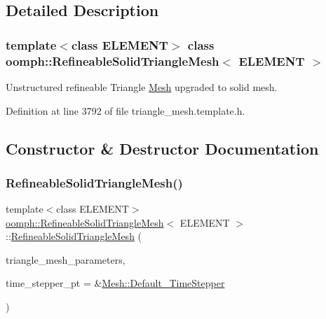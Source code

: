 \subsection{Detailed Description}
\subsubsection*{template$<$class E\+L\+E\+M\+E\+NT$>$\newline
class oomph\+::\+Refineable\+Solid\+Triangle\+Mesh$<$ E\+L\+E\+M\+E\+N\+T $>$}

Unstructured refineable Triangle \hyperlink{classoomph_1_1Mesh}{Mesh} upgraded to solid mesh. 

Definition at line 3792 of file triangle\+\_\+mesh.\+template.\+h.



\subsection{Constructor \& Destructor Documentation}
\mbox{\label{classoomph_1_1RefineableSolidTriangleMesh_a813f756c2576d7ef129a603f4ac441ba}} 
\subsubsection{\texorpdfstring{Refineable\+Solid\+Triangle\+Mesh()}{RefineableSolidTriangleMesh()}\hspace{0.1cm}{\footnotesize\ttfamily [1/2]}}
{\footnotesize\ttfamily template$<$class E\+L\+E\+M\+E\+NT$>$ \\
\hyperlink{classoomph_1_1RefineableSolidTriangleMesh}{oomph\+::\+Refineable\+Solid\+Triangle\+Mesh}$<$ E\+L\+E\+M\+E\+NT $>$\+::\hyperlink{classoomph_1_1RefineableSolidTriangleMesh}{Refineable\+Solid\+Triangle\+Mesh} (\begin{DoxyParamCaption}\item[{\hyperlink{classoomph_1_1TriangleMeshParameters}{Triangle\+Mesh\+Parameters} \&}]{triangle\+\_\+mesh\+\_\+parameters,  }\item[{\hyperlink{classoomph_1_1TimeStepper}{Time\+Stepper} $\ast$}]{time\+\_\+stepper\+\_\+pt = {\ttfamily \&\hyperlink{classoomph_1_1Mesh_a12243d0fee2b1fcee729ee5a4777ea10}{Mesh\+::\+Default\+\_\+\+Time\+Stepper}} }\end{DoxyParamCaption})\hspace{0.3cm}{\ttfamily [inline]}}



